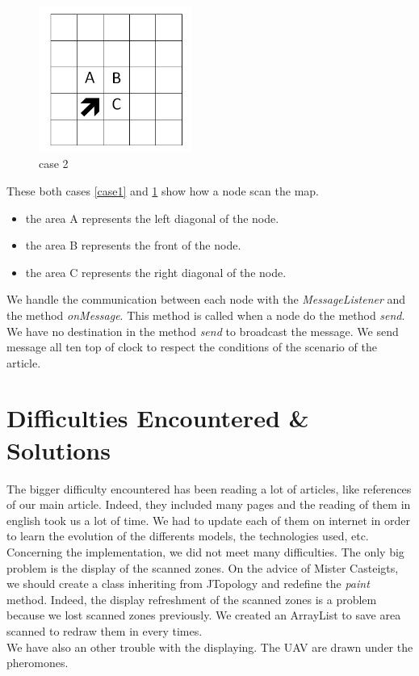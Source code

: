 \begin{figure}[!h]
\center
\includegraphics[width=5cm]{../images/grille_case_2.png}
\caption{\label{case2}case 2}
\end{figure}

These both cases \ref{case1} and \ref{case2} show how a node scan the map.

\begin{itemize}
\item the area A represents the left diagonal of the node.
\item the area B represents the front of the node.
\item the area C represents the right diagonal of the node.
\end{itemize}

We handle the communication between each node with the \textit{MessageListener} and the method \textit{onMessage}. This method is called when a node do the method \textit{send}. We have no destination in the method \textit{send} to broadcast the message. We send message all ten top of clock to respect the conditions of the scenario of the article.

\newpage

\section{Difficulties Encountered \& Solutions}

The bigger difficulty encountered has been reading a lot of articles, like references of our main article. Indeed, they included many pages and the reading of them in english took us a lot of time. We had to update each of them on internet in order to learn the evolution of the differents models, the technologies used, etc.\\

Concerning the implementation, we did not meet many difficulties. The only big problem is the display of the scanned zones. On the advice of Mister Casteigts, we should create a class inheriting from JTopology and redefine the \textit{paint} method. Indeed, the display refreshment of the scanned zones is a problem because we lost scanned zones previously. We created an ArrayList to save area scanned to redraw them in every times.\\

We have also an other trouble with the displaying. The UAV are drawn under the pheromones.
